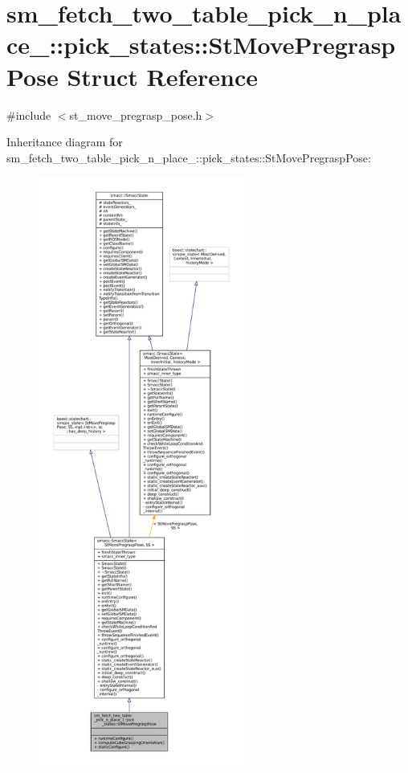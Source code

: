 \hypertarget{structsm__fetch__two__table__pick__n__place__1_1_1pick__states_1_1StMovePregraspPose}{}\section{sm\+\_\+fetch\+\_\+two\+\_\+table\+\_\+pick\+\_\+n\+\_\+place\+\_\+:\+:pick\+\_\+states\+:\+:St\+Move\+Pregrasp\+Pose Struct Reference}
\label{structsm__fetch__two__table__pick__n__place__1_1_1pick__states_1_1StMovePregraspPose}


{\ttfamily \#include $<$st\+\_\+move\+\_\+pregrasp\+\_\+pose.\+h$>$}



Inheritance diagram for sm\+\_\+fetch\+\_\+two\+\_\+table\+\_\+pick\+\_\+n\+\_\+place\+\_\+:\+:pick\+\_\+states\+:\+:St\+Move\+Pregrasp\+Pose\+:
\nopagebreak
\begin{figure}[H]
\begin{center}
\leavevmode
\includegraphics[height=550pt]{structsm__fetch__two__table__pick__n__place__1_1_1pick__states_1_1StMovePregraspPose__inherit__graph}
\end{center}
\end{figure}



